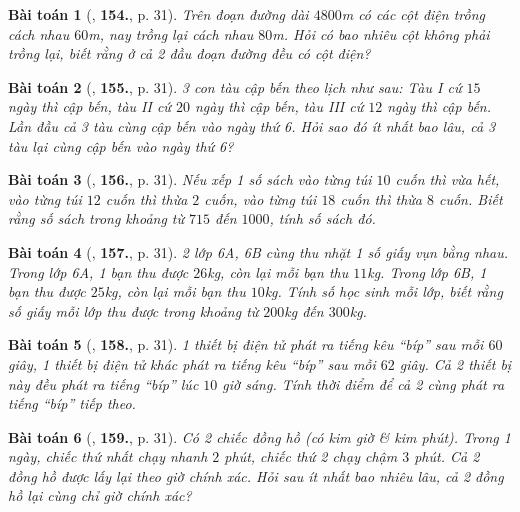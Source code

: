 \documentclass{article}
\numberwithin{equation}{section}
\newtheorem{baitoan}{Bài toán}[section]
\begin{document}
\begin{baitoan}[\cite{Binh_Toan_6_tap_1}, \textbf{154.}, p. 31]
	Trên đoạn đường dài $4800$m có các cột điện trồng cách nhau $60$m, nay trồng lại cách nhau $80$m. Hỏi có bao nhiêu cột không phải trồng lại, biết rằng ở cả 2 đầu đoạn đường đều có cột điện?
\end{baitoan}

\begin{baitoan}[\cite{Binh_Toan_6_tap_1}, \textbf{155.}, p. 31]
	3 con tàu cập bến theo lịch như sau: Tàu I cứ $15$ ngày thì cập bến, tàu II cứ $20$ ngày thì cập bến, tàu III cứ $12$ ngày thì cập bến. Lần đầu cả 3 tàu cùng cập bến vào ngày thứ 6. Hỏi sao đó ít nhất bao lâu, cả 3 tàu lại cùng cập bến vào ngày thứ 6?
\end{baitoan}

\begin{baitoan}[\cite{Binh_Toan_6_tap_1}, \textbf{156.}, p. 31]
	Nếu xếp 1 số sách vào từng túi $10$ cuốn thì vừa hết, vào từng túi $12$ cuốn thì thừa $2$ cuốn, vào từng túi $18$ cuốn thì thừa $8$ cuốn. Biết rằng số sách trong khoảng từ $715$ đến $1000$, tính số sách đó.
\end{baitoan}

\begin{baitoan}[\cite{Binh_Toan_6_tap_1}, \textbf{157.}, p. 31]
	2 lớp 6A, 6B cùng thu nhặt 1 số giấy vụn bằng nhau. Trong lớp 6A, 1 bạn thu được $26$kg, còn lại mỗi bạn thu $11$kg. Trong lớp 6B, 1 bạn thu được $25$kg, còn lại mỗi bạn thu $10$kg. Tính số học sinh mỗi lớp, biết rằng số giấy mỗi lớp thu được trong khoảng từ $200$kg đến $300$kg.
\end{baitoan}

\begin{baitoan}[\cite{Binh_Toan_6_tap_1}, \textbf{158.}, p. 31]
	1 thiết bị điện tử phát ra tiếng kêu ``bíp'' sau mỗi $60$ giây, 1 thiết bị điện tử khác phát ra tiếng kêu ``bíp'' sau mỗi $62$ giây. Cả 2 thiết bị này đều phát ra tiếng ``bíp'' lúc $10$ giờ sáng. Tính thời điểm để cả 2 cùng phát ra tiếng ``bíp'' tiếp theo.
\end{baitoan}

\begin{baitoan}[\cite{Binh_Toan_6_tap_1}, \textbf{159.}, p. 31]
	Có 2 chiếc đồng hồ (có kim giờ \& kim phút). Trong 1 ngày, chiếc thứ nhất chạy nhanh $2$ phút, chiếc thứ 2 chạy chậm $3$ phút. Cả 2 đồng hồ được lấy lại theo giờ chính xác. Hỏi sau ít nhất bao nhiêu lâu, cả 2 đồng hồ lại cùng chỉ giờ chính xác?
\end{baitoan}
\end{document}
